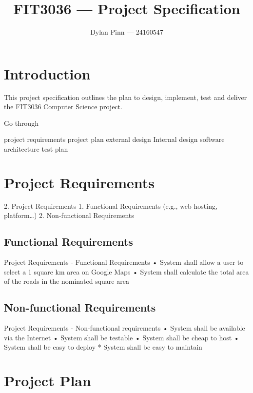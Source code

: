 \documentclass[a4paper,11pt]{article}
\begin{document}
\title{FIT3036 --- Project Specification}
\author{Dylan Pinn --- 24160547}
\maketitle
\pagebreak

\tableofcontents
\pagebreak

\section{Introduction}


This project specification outlines the plan to design, implement, test and deliver the FIT3036 Computer Science project.

Go through

project requirements
project plan
external design
Internal design
software architecture
test plan

\section{Project Requirements}


2. Project Requirements
  1. Functional Requirements (e.g., web hosting, platform…)
  2. Non-functional Requirements

\subsection{Functional Requirements}


Project Requirements - Functional Requirements
• System shall allow a user to select a 1 square km area on Google Maps
• System shall calculate the total area of the roads in the nominated square area

\subsection{Non-functional Requirements}


Project Requirements - Non-functional requirements
• System shall be available via the Internet
• System shall be testable
• System shall be cheap to host
• System shall be easy to deploy
* System shall be easy to maintain

\section{Project Plan}
\end{document}
